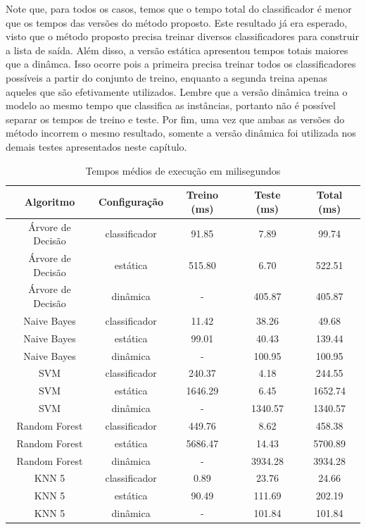 Note que, para todos os casos, temos que o tempo total do classificador é menor que os tempos das versões do método proposto.
Este resultado já era esperado, visto que o método proposto precisa treinar diversos classificadores para construir a lista de saída.
Além disso, a versão estática apresentou tempos totais maiores que a dinâmca.
Isso ocorre pois a primeira precisa treinar todos os classificadores possíveis a partir do conjunto de treino, enquanto a segunda treina apenas aqueles que são efetivamente utilizados.
Lembre que a versão dinâmica treina o modelo ao mesmo tempo que classifica as instâncias, portanto não é possível separar os tempos de treino e teste.
Por fim, uma vez que ambas as versões do método incorrem o mesmo resultado, somente a versão dinâmica foi utilizada nos demais testes apresentados neste capítulo.

\begin{table}[h!]
  \begin{center}
    \resizebox{\textwidth}{!} {
    \begin{tabular}{ccccc}
      \hline
      \textbf{Algoritmo} & \textbf{Configuração} & \textbf{Treino (ms)} & \textbf{Teste (ms)} & \textbf{Total (ms)}\\
      \hline

      Árvore de Decisão & classificador & 91.85 & 7.89 & 99.74\\
      Árvore de Decisão & estática & 515.80 & 6.70 & 522.51\\
      Árvore de Decisão & dinâmica & - & 405.87 & 405.87\\
      Naive Bayes &  classificador & 11.42 & 38.26 & 49.68\\
      Naive Bayes &  estática & 99.01 & 40.43 & 139.44\\
      Naive Bayes &  dinâmica & - & 100.95 & 100.95\\
      SVM & classificador & 240.37 & 4.18 & 244.55\\
      SVM & estática & 1646.29 & 6.45 & 1652.74\\
      SVM & dinâmica & - & 1340.57 & 1340.57\\
      Random Forest &  classificador & 449.76 & 8.62 & 458.38\\
      Random Forest &  estática & 5686.47 & 14.43 & 5700.89\\
      Random Forest &  dinâmica & - & 3934.28 & 3934.28\\
      KNN 5 & classificador & 0.89 & 23.76 & 24.66\\
      KNN 5 & estática  & 90.49 & 111.69  & 202.19\\
      KNN 5 & dinâmica  & - & 101.84 & 101.84\\

      \hline
    \end{tabular}
    }
    \caption{Tempos médios de execução em milisegundos}
    \label{tab:tempostestes}
  \end{center}
\end{table}


